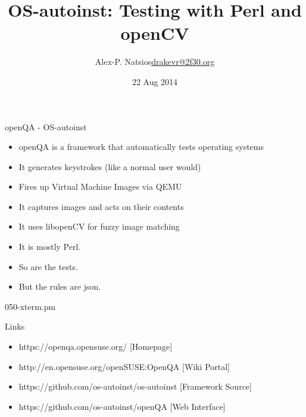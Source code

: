 \documentclass{beamer}
\title{OS-autoinst: Testing with Perl and openCV}
\author{\texorpdfstring{Alex-P. Natsios\newline\url{drakevr@2f30.org}}{Author}}
\institute{YAPC::EU 2014 - sofia}
\date{22 Aug 2014}
\begin{document}
    \begin{frame}
       \titlepage
    \end{frame}

    \begin{frame}{openQA - OS-autoinst}
        \begin{itemize}
            \item openQA is a framework that automatically tests operating systems
            \item It generates keystrokes (like a normal user would)
            \item Fires up Virtual Machine Images via QEMU
            \item It captures images and acts on their contents
            \item It uses libopenCV for fuzzy image matching
            \item It is mostly Perl.
            \item So are the tests.
            \item But the rules are json.
        \end{itemize}
    \end{frame}

    \begin{frame}{050-xterm.pm}
        \tiny
        
    \end{frame}

    \begin{frame}{Links}
        \begin{itemize}
            \item https://openqa.opensuse.org/ [Homepage]
            \item http://en.opensuse.org/openSUSE:OpenQA [Wiki Portal]
            \item https://github.com/os-autoinst/os-autoinst [Framework Source]
            \item https://github.com/os-autoinst/openQA [Web Interface]
        \end{itemize}
    \end{frame}
\end{document}
